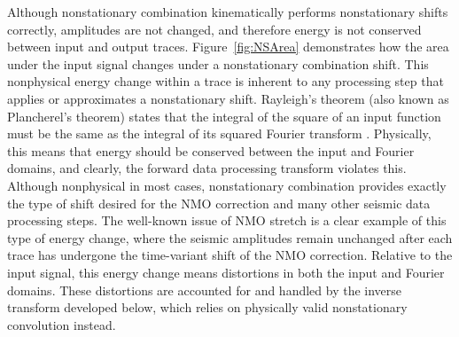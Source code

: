 Although nonstationary combination kinematically performs nonstationary shifts correctly, amplitudes are not changed, and therefore energy is not conserved between input and output traces.  
Figure~\ref{fig:NSArea} demonstrates how the area under the input signal changes under a nonstationary combination shift.
This nonphysical energy change within a trace is inherent to any processing step that applies or approximates a nonstationary shift.  
Rayleigh's theorem (also known as Plancherel's theorem) states that the integral of the square of an input function must be the same as the integral of its squared Fourier transform \citep{karl89}.
Physically, this means that energy should be conserved between the input and Fourier domains, and clearly, the forward data processing transform violates this.
Although nonphysical in most cases, nonstationary combination provides exactly the type of shift desired for the NMO correction and many other seismic data processing steps.
The well-known issue of NMO stretch \citep{barnes92} is a clear example of this type of energy change, where the seismic amplitudes remain unchanged after each trace has undergone the time-variant shift of the NMO correction.
Relative to the input signal, this energy change means distortions in both the input and Fourier domains.
These distortions are accounted for and handled by the inverse transform developed below, which relies on physically valid nonstationary convolution instead.



